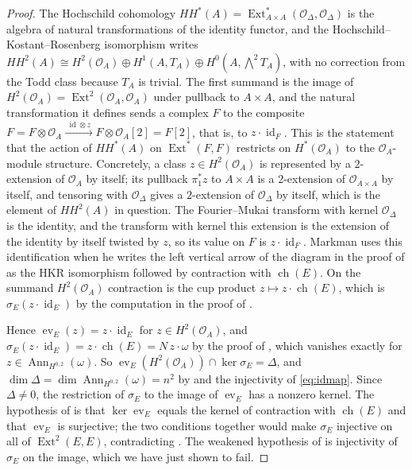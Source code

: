 \documentclass[11pt,reqno]{amsart}
\theoremstyle{plain}
\theoremstyle{definition}
\theoremstyle{remark}
\newcommand{\cO}{\mathcal{O}}
\DeclareMathOperator{\ch}{ch}
\DeclareMathOperator{\Ext}{Ext}
\DeclareMathOperator{\id}{id}
\DeclareMathOperator{\Ann}{Ann}
\begin{document}
\begin{proof}
The Hochschild cohomology $HH^{*}(A)=\Ext^{*}_{A\times A}(\cO_{\Delta},\cO_{\Delta})$
is the algebra of natural transformations of the identity functor, and the
Hochschild--Kostant--Rosenberg isomorphism \cite{Cal05,BF08} writes
$HH^{2}(A)\cong H^{2}(\cO_{A})\oplus H^{1}(A,T_{A})\oplus H^{0}(A,\bigwedge^{2}T_{A})$,
with no correction from the Todd class because $T_{A}$ is trivial. The first
summand is the image of $H^{2}(\cO_{A})=\Ext^{2}(\cO_{A},\cO_{A})$ under
pullback to $A\times A$, and the natural transformation it defines sends a
complex $F$ to the composite $F=F\otimes\cO_{A}\xrightarrow{\;\id\otimes z\;}
F\otimes\cO_{A}[2]=F[2]$, that is, to $z\cdot\id_{F}$. This is the statement
that the action of $HH^{*}(A)$ on $\Ext^{*}(F,F)$ restricts on $H^{*}(\cO_{A})$
to the $\cO_{A}$-module structure. Concretely, a class $z\in H^{2}(\cO_{A})$
is represented by a $2$-extension of $\cO_{A}$ by itself; its pullback
$\pi_{1}^{*}z$ to $A\times A$ is a $2$-extension of $\cO_{A\times A}$ by
itself, and tensoring with $\cO_{\Delta}$ gives a $2$-extension of
$\cO_{\Delta}$ by itself, which is the element of $HH^{2}(A)$ in question. The
Fourier--Mukai transform with kernel $\cO_{\Delta}$ is the identity, and the
transform with kernel this extension is the extension of the identity by
itself twisted by $z$, so its value on $F$ is $z\cdot\id_{F}$. Markman uses
this identification when he writes the left vertical arrow of the diagram in
the proof of \cite[Lemma~11.3]{Mar25b} as the HKR isomorphism followed by
contraction with $\ch(E)$. On the summand $H^{2}(\cO_{A})$ contraction is the
cup product $z\mapsto z\cdot\ch(E)$, which is $\sigma_{E}(z\cdot\id_{E})$ by
the computation in the proof of .

Hence $\operatorname{ev}_{E}(z)=z\cdot\id_{E}$ for $z\in H^{2}(\cO_{A})$, and
$\sigma_{E}(z\cdot\id_{E})=z\cdot\ch(E)=N\,z\cdot\omega$ by the proof of
, which vanishes exactly for
$z\in\Ann_{H^{0,2}}(\omega)$. So
$\operatorname{ev}_{E}(H^{2}(\cO_{A}))\cap\ker\sigma_{E}=\Delta$, and
$\dim\Delta=\dim\Ann_{H^{0,2}}(\omega)=n^{2}$ by  and
the injectivity of \eqref{eq:idmap}. Since $\Delta\ne0$, the restriction of
$\sigma_{E}$ to the image of $\operatorname{ev}_{E}$ has a nonzero kernel.
The hypothesis of \cite[Lemma 11.3]{Mar25b} is that
$\ker\operatorname{ev}_{E}$ equals the kernel of contraction with $\ch(E)$ and
that $\operatorname{ev}_{E}$ is surjective; the two conditions together would
make $\sigma_{E}$ injective on all of $\Ext^{2}(E,E)$, contradicting
. The weakened hypothesis of
\cite[Question 11.4]{Mar25b} is injectivity of $\sigma_{E}$ on the image,
which we have just shown to fail.
\end{proof}
\end{document}
